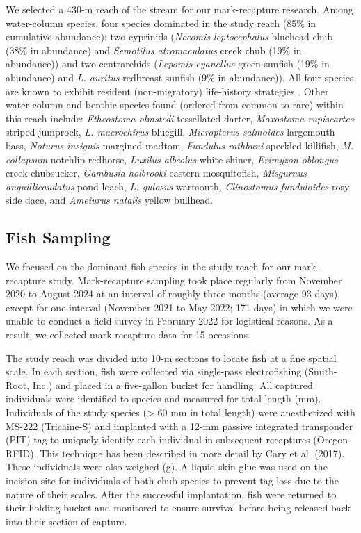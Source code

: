 \documentclass[11pt, class=article, crop=false]{standalone}
\begin{document}
We selected a 430-m reach of the stream for our mark-recapture research. Among water-column species, four species dominated in the study reach (85\% in cumulative abundance): two cyprinids (\textit{Nocomis leptocephalus} bluehead chub  (38\% in abundance) and \textit{Semotilus atromaculatus} creek chub (19\% in abundance)) and two centrarchids (\textit{Lepomis cyanellus} green sunfish (19\% in abundance) and \textit{L. auritus} redbreast sunfish (9\% in abundance)). All four species are known to exhibit resident (non-migratory) life-history strategies \citep{teruiNonrandomDispersalSympatric2021}. Other water-column and benthic species found (ordered from common to rare) within this reach include: \textit{Etheostoma olmstedi} tessellated darter, \textit{Moxostoma rupiscartes} striped jumprock, \textit{L. macrochirus} bluegill, \textit{Micropterus salmoides} largemouth bass, \textit{Noturus insignis} margined madtom, \textit{Fundulus rathbuni} speckled killifish, \textit{M. collapsum} notchlip redhorse, \textit{Luxilus albeolus} white shiner, \textit{Erimyzon oblongus} creek chubsucker, \textit{Gambusia holbrooki} eastern mosquitofish, \textit{Misgurnus anguillicaudatus} pond loach, \textit{L. gulosus} warmouth, \textit{Clinostomus funduloides} rosy side dace, and \textit{Ameiurus natalis} yellow bullhead. 

\subsection{Fish Sampling}

We focused on the dominant fish species in the study reach for our mark-recapture study. Mark-recapture sampling took place regularly from November 2020 to August 2024 at an interval of roughly three months (average 93 days), except for one interval (November 2021 to May 2022; 171 days) in which we were unable to conduct a field survey in February 2022 for logistical reasons. As a result, we collected mark-recapture data for 15 occasions.

The study reach was divided into 10-m sections to locate fish at a fine spatial scale. In each section, fish were collected via single-pass electrofishing (Smith-Root, Inc.) and placed in a five-gallon bucket for handling. All captured individuals were identified to species and measured for total length (mm). Individuals of the study species (> 60 mm in total length) were anesthetized with MS-222 (Tricaine-S) and implanted with a 12-mm passive integrated transponder (PIT) tag to uniquely identify each individual in subsequent recaptures (Oregon RFID). This technique has been described in more detail by Cary et al. (2017). These individuals were also weighed (g). A liquid skin glue was used on the incision site for individuals of both chub species to prevent tag loss due to the nature of their scales. After the successful implantation, fish were returned to their holding bucket and monitored to ensure survival before being released back into their section of capture. 
\end{document}
